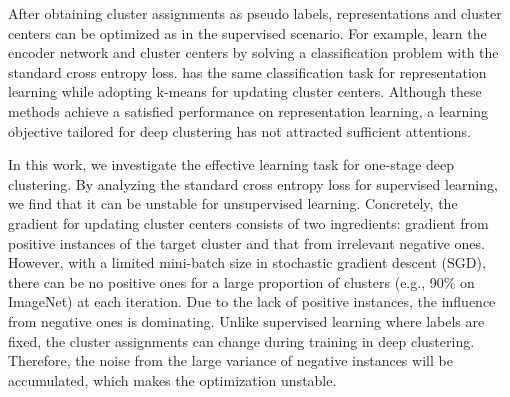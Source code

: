 \documentclass[10pt,twocolumn,letterpaper]{article}
\begin{document}
After obtaining cluster assignments as pseudo labels, representations and cluster centers can be optimized as in the supervised scenario. For example, \cite{CaronMMGBJ20,CaronTMJMBJ21} learn the encoder network and cluster centers by solving a classification problem with the standard cross entropy loss. \cite{coke} has the same classification task for representation learning while adopting k-means for updating cluster centers. Although these methods achieve a satisfied performance on representation learning, a learning objective tailored for deep clustering has not attracted sufficient attentions.

In this work, we investigate the effective learning task for one-stage deep clustering. By analyzing the standard cross entropy loss for supervised learning, we find that it can be unstable for unsupervised learning. Concretely, the gradient for updating cluster centers consists of two ingredients: gradient from positive instances of the target cluster and that from irrelevant negative ones. However, with a limited mini-batch size in stochastic gradient descent (SGD), there can be no positive ones for a large proportion of clusters (e.g., 90\% on ImageNet) at each iteration. Due to the lack of positive instances, the influence from negative ones is dominating. Unlike supervised learning where labels are fixed, the cluster assignments can change during training in deep clustering. Therefore, the noise from the large variance of negative instances will be accumulated, which makes the optimization unstable. 
\end{document}
